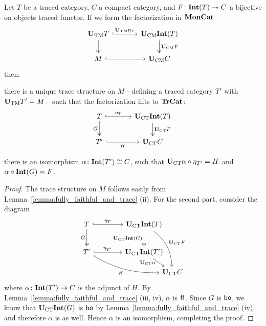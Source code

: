 \documentclass[12pt,oneside,article,draft]{memoir}
\begin{document}
\begin{lemma}\label{lem:Tr_bo_Int}
   Let $T$ be a traced category, $C$ a compact category, and $F\colon\mathbf{Int}(T)\twoheadrightarrow C$ a
   bijective on objects traced functor. If we form the factorization in $\mathbf{MonCat}$
   \begin{equation*}
      \begin{tikzcd}[column sep=large]
         \UTM T \ar[r,hook,"\UTM\eta_{T}"] \ar[d,two heads]
            & \UCM\Int(T) \ar[d,two heads,"\UCM F"] \\
         M \ar[r,hook] & \UCM C
      \end{tikzcd}
   \end{equation*}
   then:
   \begin{compactitem}
      \item there is a unique trace structure on $M$---defining a traced category $T'$ with $\mathbf{U}_{\textrm{TM}}
         T'=M$---such that the factorization lifts to $\mathbf{TrCat}$:
         \begin{equation*}
            \begin{tikzcd}[column sep=large]
               T \ar[r,hook,"\eta_{T}"] \ar[d,two heads,"G"']
                  & \UCT\Int(T) \ar[d,two heads,"\UCT F"] \\
               T' \ar[r,hook,"H"'] & \UCT C
            \end{tikzcd}
         \end{equation*}
      \item there is an isomorphism $\alpha\colon\mathbf{Int}(T')\cong C$, such that $\mathbf{U}_{\textrm{CT}}\alpha\circ
         \eta_{T'}=H$ and $\alpha\circ\mathbf{Int}(G)=F$.
   \end{compactitem}
\end{lemma}
\begin{proof}
   The trace structure on $M$ follows easily from Lemma~\ref{lemma:fully_faithful_and_trace} (ii). For the second part, consider the diagram
   \begin{equation*}
      \begin{tikzcd}[column sep=4em, row sep=5ex]
         T \ar[r,hook,"\eta_{T}"] \ar[d,two heads,"G"']
            & \UCT\Int(T) \ar[d,two heads,"\UCT\Int(G)"']
               \ar[ddr,bend left=25,"\UCT F"] &[between origins] \\
         T' \ar[r,hook,"\eta_{T'}"] \ar[drr,hook,bend right=15,"H"']
            & \UCT\Int(T') \ar[dr,"\UCT\alpha"' {inner sep=0pt,pos=.25}] & \\[-10]
         &&\UCT C
      \end{tikzcd}
   \end{equation*}
   where $\alpha\colon\mathbf{Int}(T')\to C$ is the adjunct of $H$. By Lemma~\ref{lemma:fully_faithful_and_trace} (iii, iv), $\alpha$ is $\mathsf{ff}$. Since $G$ is $\mathsf{bo}$, we
   know that $\mathbf{U}_{\textrm{CT}}\mathbf{Int}(G)$ is $\mathsf{bo}$ by Lemma~\ref{lemma:fully_faithful_and_trace} (iv), and therefore $\alpha$ is as well. Hence $\alpha$ is an isomorphism, completing the proof.
\end{proof}
\end{document}
